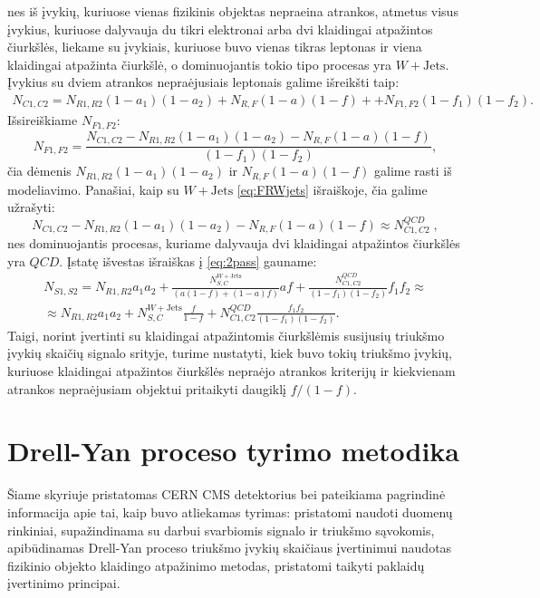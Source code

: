 \documentclass[a4paper, 12pt, oneside]{article}
\newcommand{\WJets}{W\! +\!\mathrm{Jets}}
\newcommand{\QCD}{QC\! D}
\newlength\q
\begin{document}
nes iš įvykių, kuriuose vienas fizikinis objektas nepraeina atrankos, atmetus visus įvykius, kuriuose dalyvauja du tikri elektronai
arba dvi klaidingai atpažintos čiurkšlės, liekame su įvykiais, kuriuose buvo vienas tikras leptonas ir viena klaidingai atpažinta
čiurkšlė, o dominuojantis tokio tipo procesas yra $\WJets$.
Įvykius su dviem atrankos nepraėjusiais leptonais galime išreikšti taip:
\begin{equation}
\label{eq:2fail}
	\begin{gathered}
		N_{C1,C2} = N_{R1,R2} (1-a_1)(1-a_2) + N_{R,F} (1-a)(1-f) + 
						+ N_{F1,F2} (1-f_1)(1-f_2).
	\end{gathered}
\end{equation}
Išsireiškiame $N_{F1,F2}$:
\begin{equation}
\label{eq:2fake}
	N_{F1,F2} = \frac{ N_{C1,C2} - N_{R1,R2} (1-a_1)(1-a_2) - N_{R,F} (1-a)(1-f) }
					 { (1-f_1)(1-f_2) },
\end{equation}
čia dėmenis $N_{R1,R2} (1-a_1)(1-a_2)$ ir $N_{R,F} (1-a)(1-f)$ galime rasti iš modeliavimo.
Panašiai, kaip su $\WJets$ \eqref{eq:FRWjets} išraiškoje, čia galime užrašyti:
\begin{equation}
\label{eq:FRQCD}
	N_{C1,C2} - N_{R1,R2} (1-a_1)(1-a_2) - N_{R,F} (1-a)(1-f) \approx N_{C1,C2}^{\QCD} \; ,
\end{equation}
nes dominuojantis procesas, kuriame dalyvauja dvi klaidingai atpažintos čiurkšlės yra $\QCD$.
Įstatę išvestas išraiškas į \eqref{eq:2pass} gauname:
\begin{equation}
\label{eq:2passFR}
	\begin{gathered}
		N_{S1,S2} = N_{R1,R2} a_1 a_2 + \frac{N_{S,C}^{\WJets}}{(a(1-f)+(1-a)f)}af +
				    \frac{N_{C1,C2}^{\QCD}}{(1-f_1)(1-f_2)}f_1f_2 \approx \\ \approx
					N_{R1,R2} a_1 a_2 + N_{S,C}^{\WJets} \frac{f}{1-f} +
					N_{C1,C2}^{\QCD} \frac{f_1 f_2}{(1-f_1)(1-f_2)}. 
	\end{gathered}
\end{equation}
Taigi, norint įvertinti su klaidingai atpažintomis čiurkšlėmis susijusių triukšmo įvykių skaičių signalo srityje,
turime nustatyti, kiek buvo tokių triukšmo įvykių, kuriuose klaidingai atpažintos čiurkšlės nepraėjo atrankos
kriterijų ir kiekvienam atrankos nepraėjusiam objektui pritaikyti daugiklį $f/(1-f)$.


\newpage
\section{Drell-Yan proceso tyrimo metodika}
Šiame skyriuje pristatomas CERN CMS detektorius bei pateikiama pagrindinė informacija apie tai, kaip buvo atliekamas
tyrimas: pristatomi naudoti duomenų rinkiniai, supažindinama su darbui svarbiomis signalo ir triukšmo sąvokomis,
apibūdinamas Drell-Yan proceso triukšmo įvykių skaičiaus įvertinimui naudotas fizikinio
objekto klaidingo atpažinimo metodas, pristatomi taikyti paklaidų įvertinimo principai.
\end{document}
